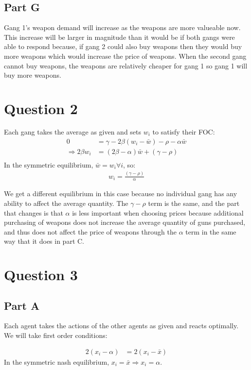\documentclass[11pt]{article} %
\begin{document}
\subsection{Part G}
Gang 1's weapon demand will increase as the weapons are more valueable now. This increase will be larger in magnitude than it would be if both gangs were able to respond because, if gang 2 could also buy weapons then they would buy more weapons which would increase the price of weapons. When the second gang cannot buy weapons, the weapons are relatively cheaper for gang 1 so gang 1 will buy more weapons.
\section{Question 2}
Each gang takes the average as given and sets $w_i$ to satisfy their FOC:
\begin{align*}
0&=\gamma - 2\beta (w_i - \bar{w}) - \rho - \alpha \bar{w}\\
\Rightarrow 2\beta w_i &= ( 2\beta - \alpha)\bar{w} + (\gamma - \rho)\\
\end{align*}
In the symmetric equilibrium, $\bar{w} = w_i \forall i$, so:
\begin{align*}
 w_i = \frac{(\gamma - \rho)}{\alpha}
\end{align*}

We get a different equilibrium in this case because no individual gang has any ability to affect the average quantity. The $\gamma - \rho$ term is the same, and the part that changes is that $\alpha$ is less important when choosing prices because additional purchasing of weapons does not increase the average quantity of guns purchased, and thus does not affect the price of weapons through the $\alpha$ term in the same way that it does in part C.

\section{Question 3} %
\subsection{Part A}
Each agent takes the actions of the other agents as given and reacts optimally. We will take first order conditions:

\begin{align*}
 2(x_i - \alpha) &= 2(x_i - \bar{x})
\end{align*}
In the symmetric nash equilibrium, $x_i = \bar{x} \Rightarrow x_i = \alpha$.
\end{document}
